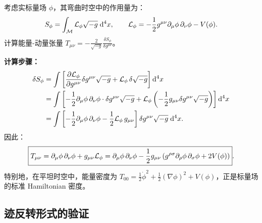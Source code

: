\begin{example}
考虑实标量场 $\phi$，其弯曲时空中的作用量为：
\begin{equation}
    S_{\phi} = \int_{\mathcal{M}} \mathcal{L}_\phi \sqrt{-g} \; \dd^4 x, \qquad
    \mathcal{L}_\phi = -\frac{1}{2} g^{\mu\nu} \partial_\mu\phi \, \partial_\nu\phi - V(\phi).
\end{equation}
计算能量-动量张量 $T_{\mu\nu} = -\frac{2}{\sqrt{-g}}\frac{\delta S_\phi}{\delta g^{\mu\nu}}$。

\textbf{计算步骤：}
\begin{align}
    \delta S_\phi &= \int \left[ \frac{\partial\mathcal{L}_\phi}{\partial g^{\mu\nu}} \delta g^{\mu\nu} \sqrt{-g} + \mathcal{L}_\phi \, \delta\sqrt{-g} \right] \dd^4 x \\
    &= \int \left[ -\frac{1}{2}\partial_\mu\phi\,\partial_\nu\phi \cdot \delta g^{\mu\nu} \sqrt{-g} + \mathcal{L}_\phi\left(-\frac{1}{2}g_{\mu\nu}\delta g^{\mu\nu}\sqrt{-g}\right) \right] \dd^4 x \\
    &= \int \left[ -\frac{1}{2}\partial_\mu\phi\,\partial_\nu\phi - \frac{1}{2}\mathcal{L}_\phi\, g_{\mu\nu} \right] \delta g^{\mu\nu} \sqrt{-g} \; \dd^4 x.
\end{align}
因此：
\begin{equation}
    \boxed{T_{\mu\nu} = \partial_\mu\phi \, \partial_\nu\phi + g_{\mu\nu} \mathcal{L}_\phi
    = \partial_\mu\phi\,\partial_\nu\phi - \frac{1}{2}g_{\mu\nu}\left(g^{\rho\sigma}\partial_\rho\phi\,\partial_\sigma\phi + 2V(\phi)\right)}.
\end{equation}
特别地，在平坦时空中，能量密度为 $T_{00} = \frac{1}{2}\dot\phi^2 + \frac{1}{2}(\nabla\phi)^2 + V(\phi)$，正是标量场的标准 Hamiltonian 密度。
\end{example}

\subsection{迹反转形式的验证}

